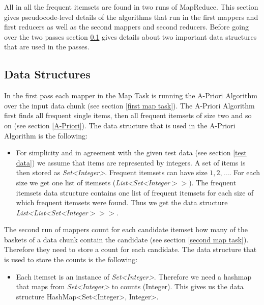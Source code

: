 All in all the frequent itemsets are found in two runs of MapReduce. This section gives pseudocode-level details of the algorithms that run in the first mappers and first reducers as well as the second mappers and second reducers. Before going over the two passes section \ref{data structures} gives details about two important data structures that are used in the passes.
\subsection{Data Structures}\label{data structures}
In the first pass each mapper in the Map Task is running the A-Priori Algorithm over the input data chunk (see section \ref{first map task}). The A-Priori Algorithm first finds all frequent single items, then all frequent itemsets of size two and so on (see section \ref{A-Priori}). The data structure that is used in the A-Priori Algorithm is the following:
\begin{itemize}
\item For simplicity and in agreement with the given test data (see section \ref{test data}) we assume that items are represented by integers. A set of items is then stored as \textit{Set<Integer>}. Frequent itemsets can have size $1,2,\hdots$. For each size we get one list of itemsets (\textit{List<Set<Integer$>>$}). The frequent itemsets data structure contains one list of frequent itemsets for each size of which frequent itemsets were found. Thus we get the data structure \textit{List<List<Set<Integer$>>>$}.
\end{itemize}

The second run of mappers count for each candidate itemset how many of the baskets of a data chunk contain the candidate (see section \ref{second map task}). Therefore they need to store a count for each candidate. The data structure that is used to store the counts is the following:
\begin{itemize}
\item Each itemset is an instance of \textit{Set<Integer>}. Therefore we need a hashmap that maps from \textit{Set<Integer>} to counts (Integer). This gives us the data structure HashMap<Set<Integer>, Integer>.
\end{itemize}
